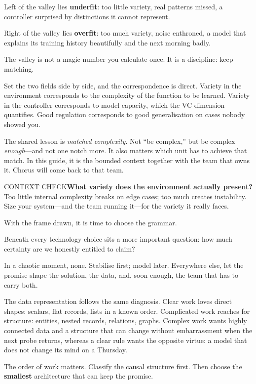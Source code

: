 \documentclass[10pt,a4paper]{article}
\newcommand{\Checkpoint}[2]{\begin{checkbox}{#1}#2\end{checkbox}}
\begin{document}
Left of the valley lies \textbf{underfit}: too little variety, real patterns missed, a controller surprised by distinctions it cannot represent.

Right of the valley lies \textbf{overfit}: too much variety, noise enthroned, a model that explains its training history beautifully and the next morning badly.

The valley is not a magic number you calculate once. It is a discipline: keep matching.

Set the two fields side by side, and the correspondence is direct. Variety in the environment corresponds to the complexity of the function to be learned. Variety in the controller corresponds to model capacity, which the VC dimension quantifies. Good regulation corresponds to good generalisation on cases nobody showed you.

The shared lesson is \emph{matched complexity}. Not “be complex,” but be complex \emph{enough}—and not one notch more. It also matters which unit has to achieve that match. In this guide, it is the bounded context together with the team that owns it. Chorus will come back to that team.

\Checkpoint{CONTEXT CHECK}{\textbf{What variety does the environment actually present?} Too little internal complexity breaks on edge cases; too much creates instability. Size your system—and the team running it—for the variety it really faces.}

With the frame drawn, it is time to choose the grammar.

Beneath every technology choice sits a more important question: how much certainty are we honestly entitled to claim?

In a chaotic moment, none. Stabilise first; model later. Everywhere else, let the promise shape the solution, the data, and, soon enough, the team that has to carry both.

The data representation follows the same diagnosis. Clear work loves direct shapes: scalars, flat records, lists in a known order. Complicated work reaches for structure: entities, nested records, relations, graphs. Complex work wants highly connected data and a structure that can change without embarrassment when the next probe returns, whereas a clear rule wants the opposite virtue: a model that does not change its mind on a Thursday.

The order of work matters. Classify the causal structure first. Then choose the \textbf{smallest} architecture that can keep the promise.
\end{document}
